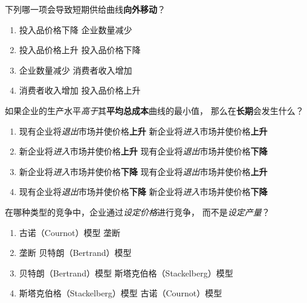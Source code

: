 \begin{question}[type=exam]{3}
  下列哪一项会导致短期供给曲线\textbf{向外移动}？
  \begin{enumerate}[label=\alph*), noitemsep]
    \item \vary
      {投入品价格下降} %
      {企业数量减少}
    \item \vary
      {投入品价格上升}
      {投入品价格下降} %
    \item \vary
      {企业数量减少}
      {消费者收入增加}
    \item \vary
      {消费者收入增加}
      {投入品价格上升}
  \end{enumerate}
\end{question}

\begin{question}[type=exam]{3}
  如果企业的生产水平\textit{高于}其\textbf{平均总成本}曲线的最小值，
  那么在\textbf{长期}会发生什么？
  \begin{enumerate}[label=\alph*), noitemsep]
    \item \vary
      {现有企业将\textit{退出}市场并使价格\textbf{上升}}
      {新企业将\textit{进入}市场并使价格\textbf{上升}} %
    \item \vary
      {新企业将\textit{进入}市场并使价格\textbf{上升}} %
      {现有企业将\textit{退出}市场并使价格\textbf{下降}}
    \item \vary
      {新企业将\textit{进入}市场并使价格\textbf{下降}}
      {现有企业将\textit{退出}市场并使价格\textbf{上升}}
    \item \vary
      {现有企业将\textit{退出}市场并使价格\textbf{下降}}
      {新企业将\textit{进入}市场并使价格\textbf{下降}}
  \end{enumerate}
\end{question}

\begin{question}[type=exam]{3}
  在哪种类型的竞争中，企业通过\textit{设定价格}进行竞争，
  而不是\textit{设定产量}？
  \begin{enumerate}[label=\alph*), noitemsep]
    \item \vary
      {古诺（Cournot）模型}
      {垄断}
    \item \vary
      {垄断}
      {贝特朗（Bertrand）模型} %
    \item \vary
      {贝特朗（Bertrand）模型} %
      {斯塔克伯格（Stackelberg）模型}
    \item \vary
      {斯塔克伯格（Stackelberg）模型}
      {古诺（Cournot）模型}
  \end{enumerate}
\end{question}

